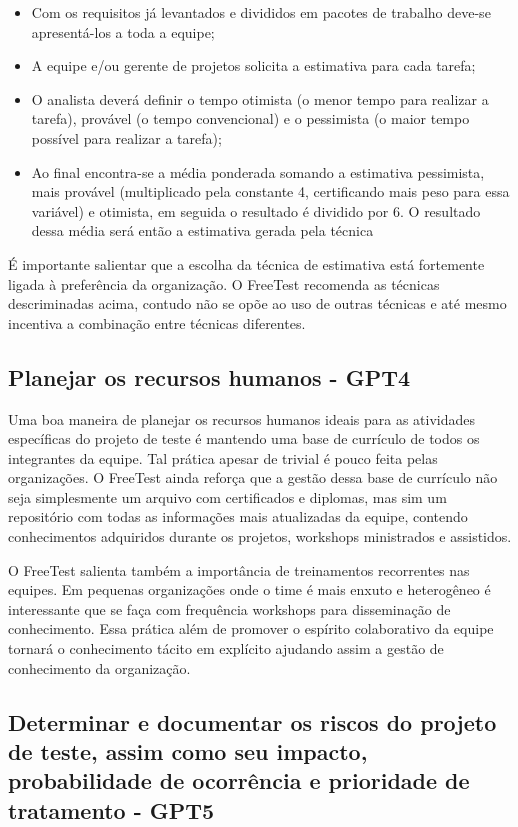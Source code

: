 \begin{itemize}
    \item Com os requisitos já levantados e divididos em pacotes de trabalho deve-se apresentá-los a toda a equipe;
    \item A equipe e/ou gerente de projetos solicita a estimativa para cada tarefa;
    \item O analista deverá definir o tempo otimista (o menor tempo para realizar a tarefa), provável (o tempo convencional) e o pessimista (o maior tempo possível para realizar a tarefa);
    \item Ao final encontra-se a média ponderada somando a estimativa pessimista, mais provável (multiplicado pela constante 4, certificando mais peso para essa variável) e otimista, em seguida o resultado é dividido por 6. O resultado dessa média será então a estimativa gerada pela técnica
\end{itemize}

É importante salientar que a escolha da técnica de estimativa está fortemente ligada à preferência da organização. O FreeTest recomenda as técnicas descriminadas acima, contudo não se opõe ao uso de outras técnicas e até mesmo incentiva a combinação entre técnicas diferentes.

\subsection{Planejar os recursos humanos - GPT4}
\label{sec:guiagpt4}

Uma boa maneira de planejar os recursos humanos ideais para as atividades específicas do projeto de teste é mantendo uma base de currículo de todos os integrantes da equipe. Tal prática apesar de trivial é pouco feita pelas organizações. O FreeTest ainda reforça que a gestão dessa base de currículo não seja simplesmente um arquivo com certificados e diplomas, mas sim um repositório com todas as informações mais atualizadas da equipe, contendo conhecimentos adquiridos durante os projetos, workshops ministrados e assistidos.

O FreeTest salienta também a importância de treinamentos recorrentes nas equipes. Em pequenas organizações onde o time é mais enxuto e heterogêneo é interessante que se faça com frequência workshops para disseminação de conhecimento. Essa prática além de promover o espírito colaborativo da equipe tornará o conhecimento tácito em explícito ajudando assim a gestão de conhecimento da organização.

\subsection{Determinar e documentar os riscos do projeto de teste, assim como seu impacto, probabilidade de ocorrência e prioridade de tratamento - GPT5}
\label{sec:guiagpt5}

